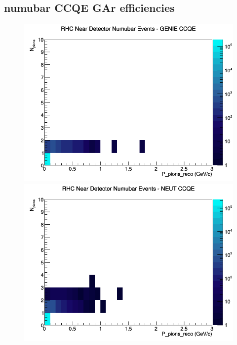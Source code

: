 \documentclass[12pt]{article}
\begin{document}
\subsection{numubar CCQE GAr efficiencies}
\begin{figure}[h]
\includegraphics[width=\linewidth]{eff_N_P/GAr/pions/CCQE_RHC_ND_numubar_N_P_GENIE.png}
\endminipage
{}
\includegraphics[width=\linewidth]{eff_N_P/GAr/pions/CCQE_RHC_ND_numubar_N_P_NEUT.png}
\endminipage
{}

\end{figure}
\end{document}
